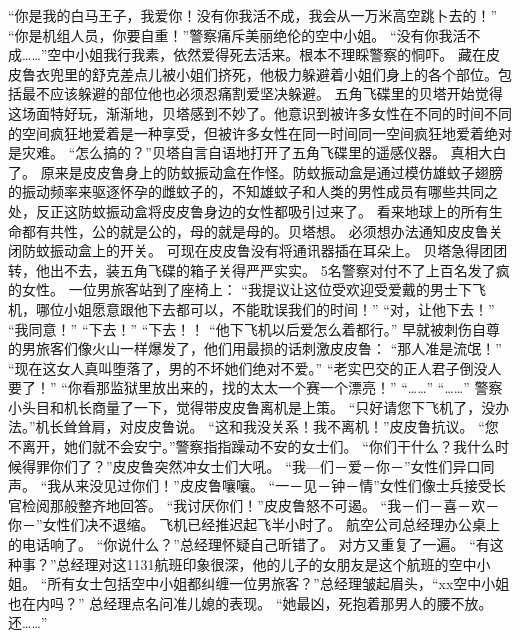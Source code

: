 \documentclass[a4paper,12pt,UTF8,twoside]{ctexbook}
\begin{document}
        “你是我的白马王子，我爱你！没有你我活不成，我会从一万米高空跳卜去的！” 
        “你是机组人员，你要自重！”警察痛斥美丽绝伦的空中小姐。 
        “没有你我活不成……”空中小姐我行我素，依然爱得死去活来。根本不理睬警察的恫吓。 
        藏在皮皮鲁衣兜里的舒克差点儿被小姐们挤死，他极力躲避着小姐们身上的各个部位。包括最不应该躲避的部位他也必须忍痛割爱坚决躲避。 
        五角飞碟里的贝塔开始觉得这场面特好玩，渐渐地，贝塔感到不妙了。他意识到被许多女性在不同的时间不同的空间疯狂地爱着是一种享受，但被许多女性在同一时间同一空间疯狂地爱着绝对是灾难。 
        “怎么搞的？”贝塔自言自语地打开了五角飞碟里的遥感仪器。 
        真相大白了。 
        原来是皮皮鲁身上的防蚊振动盒在作怪。防蚊振动盒是通过模仿雄蚊子翅膀的振动频率来驱逐怀孕的雌蚊子的，不知雄蚊子和人类的男性成员有哪些共同之处，反正这防蚊振动盒将皮皮鲁身边的女性都吸引过来了。 
        看来地球上的所有生命都有共性，公的就是公的，母的就是母的。贝塔想。 
        必须想办法通知皮皮鲁关闭防蚊振动盒上的开关。 
        可现在皮皮鲁没有将通讯器插在耳朵上。 
        贝塔急得团团转，他出不去，装五角飞碟的箱子关得严严实实。 
        5名警察对付不了上百名发了疯的女性。 
        一位男旅客站到了座椅上： 
        “我提议让这位受欢迎受爱戴的男士下飞机，哪位小姐愿意跟他下去都可以，不能耽误我们的时间！” 
      “对，让他下去！” 
      “我同意！” 
      “下去！” 
      “下去！！ 
        “他下飞机以后爱怎么着都行。” 
        早就被刺伤自尊的男旅客们像火山一样爆发了，他们用最损的话刺激皮皮鲁： 
      “那人准是流氓！” 
      “现在这女人真叫堕落了，男的不坏她们绝对不爱。” 
        “老实巴交的正人君子倒没人要了！” 
        “你看那监狱里放出来的，找的太太一个赛一个漂亮！” 
        “……” 
        “……” 
        警察小头目和机长商量了一下，觉得带皮皮鲁离机是上策。 
        “只好请您下飞机了，没办法。”机长耸耸肩，对皮皮鲁说。 
        “这和我没关系！我不离机！”皮皮鲁抗议。 
        “您不离开，她们就不会安宁。”警察指指躁动不安的女士们。 
        “你们干什么？我什么时候得罪你们了？”皮皮鲁突然冲女士们大吼。 
        “我—们－爱－你－”女性们异口同声。 
        “我从来没见过你们！”皮皮鲁嚷嚷。 
        “一－见－钟－情”女性们像士兵接受长官检阅那般整齐地回答。 
        “我讨厌你们！”皮皮鲁怒不可遏。 
        “我－们－喜－欢－你－”女性们决不退缩。 
        飞机已经推迟起飞半小时了。 
        航空公司总经理办公桌上的电话响了。 
        “你说什么？”总经理怀疑自己昕错了。 
        对方又重复了一遍。 
        “有这种事？”总经理对这1131航班印象很深，他的儿子的女朋友是这个航班的空中小姐。 
        “所有女士包括空中小姐都纠缠一位男旅客？”总经理皱起眉头，“xx空中小姐也在内吗？” 
        总经理点名问准儿媳的表现。 
        “她最凶，死抱着那男人的腰不放。还……” 
\end{document}
